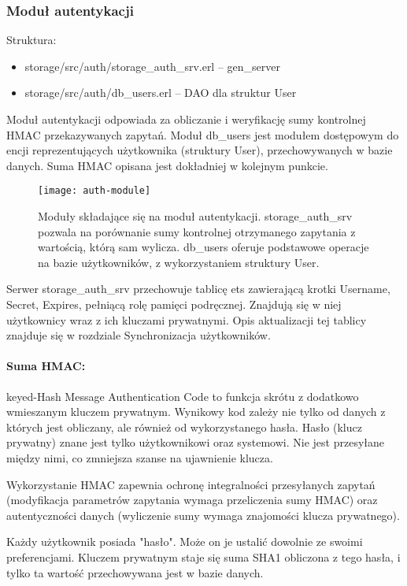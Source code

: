\subsubsection{Moduł autentykacji}
Struktura:
\begin{itemize}
	\item storage/src/auth/storage\_auth\_srv.erl – gen\_server
	\item storage/src/auth/db\_users.erl – DAO dla struktur User
\end{itemize}

Moduł autentykacji odpowiada za obliczanie i weryfikację sumy kontrolnej HMAC przekazywanych zapytań. Moduł db\_users jest modułem dostępowym do encji reprezentujących użytkownika (struktury User), przechowywanych w bazie danych. Suma HMAC opisana jest dokładniej w kolejnym punkcie.

\begin{figure}[!htbp]
	\centering
	\texttt{[image: auth-module]}
	\caption[Budowa modułu autentykacji.]{Moduły składające się na moduł autentykacji. storage\_auth\_srv pozwala na porównanie sumy kontrolnej otrzymanego zapytania z wartością, którą sam wylicza. db\_users oferuje podstawowe operacje na bazie użytkowników, z wykorzystaniem struktury User.}
	\label{fig:auth-module}
\end{figure}

Serwer storage\_auth\_srv przechowuje tablicę ets zawierającą krotki {Username, Secret, Expires}, pełniącą rolę pamięci podręcznej. Znajdują się w niej użytkownicy wraz z ich kluczami prywatnymi. Opis aktualizacji tej tablicy znajduje się w rozdziale Synchronizacja użytkowników.

\paragraph{Suma HMAC:} keyed-Hash Message Authentication Code to funkcja skrótu z dodatkowo wmieszanym kluczem prywatnym. Wynikowy kod zależy nie tylko od danych z których jest obliczany, ale również od wykorzystanego hasła. Hasło (klucz prywatny) znane jest tylko użytkownikowi oraz systemowi. Nie jest przesyłane między nimi, co zmniejsza szanse na ujawnienie klucza.

Wykorzystanie HMAC zapewnia ochronę integralności przesyłanych zapytań (modyfikacja parametrów zapytania wymaga przeliczenia sumy HMAC) oraz autentyczności danych (wyliczenie sumy wymaga znajomości klucza prywatnego).

Każdy użytkownik posiada "hasło". Może on je ustalić dowolnie ze swoimi preferencjami. Kluczem prywatnym staje się suma SHA1 obliczona z tego hasła, i tylko ta wartość przechowywana jest w bazie danych.
